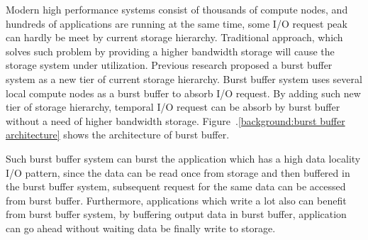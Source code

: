Modern high performance systems consist of thousands of compute nodes, and hundreds of
applications are running at the same time, some I/O request peak can hardly be meet by current
storage hierarchy. 
Traditional approach, which solves such problem by providing a higher bandwidth storage will cause
the storage system under utilization.
Previous research\cite{on_the_role_of_burst_buffers} proposed a
burst buffer system as a new tier of current storage hierarchy.
Burst buffer system uses several local compute nodes as a burst buffer to absorb I/O
request. 
By adding such new tier of storage hierarchy, temporal I/O request can be absorb by burst buffer
without a need of higher bandwidth storage. Figure~.\ref{background:burst buffer architecture}
shows the architecture of burst buffer.

Such burst buffer system can burst the application which has a high data locality I/O pattern, since
the data can be read once from storage and then buffered in the burst buffer system, subsequent
request for the same data can be accessed from burst buffer.
Furthermore, applications which write a lot also can benefit from burst buffer system, by buffering
output data in burst buffer, application can go ahead without waiting data be finally write to
storage.
